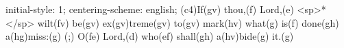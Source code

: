 initial-style: 1;
centering-scheme: english;
(c4)If(gv) thou,(f) Lord,(e) <sp>*</sp> wilt(fv) be(gv) ex(gv)treme(gv) to(gv) mark(hv) what(g) is(f) done(gh) a(hg)miss:(g) (;) O(fe) Lord,(d) who(ef) shall(gh) a(hv)bide(g) it.(g)
